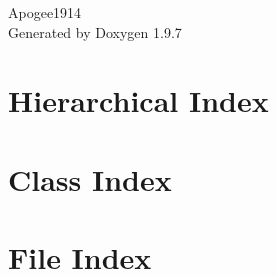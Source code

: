 \documentclass[twoside]{book}
\newcommand{\+}{\discretionary{\mbox{\scriptsize$\hookleftarrow$}}{}{}}
\newcommand{\clearemptydoublepage}{%
    \newpage{\pagestyle{empty}\cleardoublepage}%
  }
\begin{document}
  \raggedbottom
    \hypersetup{pageanchor=false,
                bookmarksnumbered=true,
                pdfencoding=unicode
               }
  \begin{titlepage}
  \vspace*{7cm}
  \begin{center}%
  {\Large Apogee1914}\\
  \vspace*{1cm}
  {\large Generated by Doxygen 1.9.7}\\
  \end{center}
  \end{titlepage}
  \clearemptydoublepage
  \tableofcontents
  \clearemptydoublepage
  \hypersetup{pageanchor=true}
\chapter{Hierarchical Index}

\chapter{Class Index}

\chapter{File Index}

\end{document}
